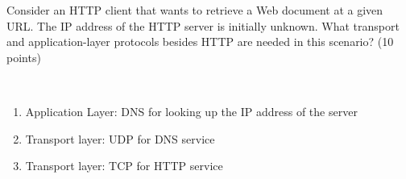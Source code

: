 \begin{exercise}[]{Consider an HTTP client that wants to retrieve a Web document at a given URL. The IP address of the HTTP server is initially unknown. What transport and application-layer protocols besides HTTP are needed in this scenario? (10 points)}
  \begin{solution}
  \par{~}
  \begin{enumerate}
      \item Application Layer:  DNS for looking up the IP address of the server
      \item Transport layer: UDP for DNS service
      \item Transport layer: TCP for HTTP service
  \end{enumerate}
  \end{solution}
  \label{ex2}
\end{exercise}


